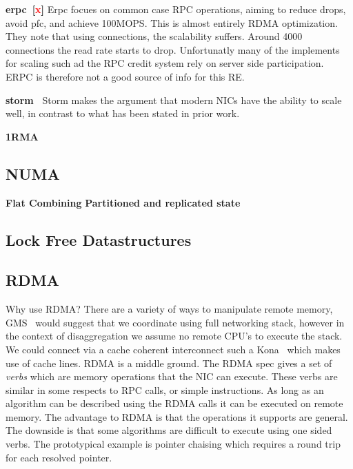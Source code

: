 \textbf{erpc~\cite{erpc}[\textcolor{red}{x}]} Erpc focues on common case RPC
operations, aiming to reduce drops, avoid pfc, and achieve 100MOPS. This is
almost entirely RDMA optimization. They note that using connections, the
scalability suffers. Around 4000 connections the read rate starts to drop.
Unfortunatly many of the implements for scaling such ad the RPC credit system
rely on server side participation. ERPC is therefore not a good source of info
for this RE.




\textbf{storm~\cite{storm}} Storm makes the argument that modern NICs have the
ability to scale well, in contrast to what has been stated in prior work.

\textbf{1RMA~\cite{1rma}}

\textbf{}

\subsection{NUMA}

\textbf{Flat Combining}
\textbf{Partitioned and replicated state}

\subsection{Lock Free Datastructures}

\subsection{RDMA}

Why use RDMA? There are a variety of ways to manipulate remote memory,
GMS~\cite{gms} would suggest that we coordinate using full networking stack,
however in the context of disaggregation we assume no remote CPU's to execute
the stack. We could connect via a cache coherent interconnect such a
Kona~\cite{kona} which makes use of cache lines. RDMA is a middle ground. The
RDMA spec gives a set of \textit{verbs} which are memory operations that the NIC
can execute. These verbs are similar in some respects to RPC calls, or simple
instructions. As long as an algorithm can be described using the RDMA calls it
can be executed on remote memory. The advantage to RDMA is that the operations
it supports are general. The downside is that some algorithms are difficult to
execute using one sided verbs. The prototypical example is pointer chaising
which requires a round trip for each resolved pointer.


